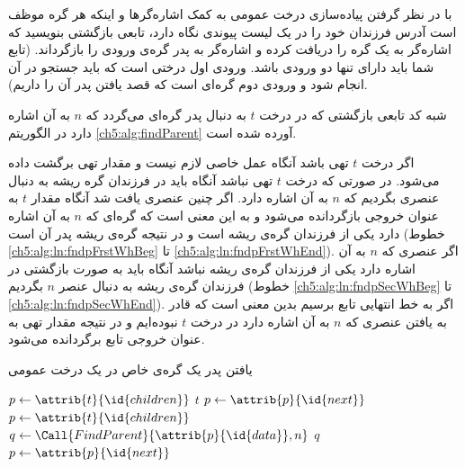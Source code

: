  با در نظر گرفتن پیاده‌سازی درخت عمومی به کمک اشاره‌گرها و اینکه هر گره موظف است آدرس فرزندان خود را در یک لیست پیوندی نگاه دارد، تابعی بازگشتی بنویسید که اشاره‌گر به یک گره را دریافت کرده و اشاره‌گر به پدر گره‌ی ورودی را بازگرداند. (تابع شما باید دارای تنها دو ورودی باشد. ورودی اول درختی است که باید جستجو در آن انجام شود و ورودی دوم گره‌ای است که قصد یافتن پدر آن را داریم).


شبه کد تابعی بازگشتی که در درخت {$t$} به دنبال پدر گره‌‌‌ای می‌گردد که {$n$} به آن اشاره دارد در الگوریتم {\ref{ch5:alg:findParent}} آورده شده است.

اگر درخت {$t$} تهی باشد آنگاه عمل خاصی لازم نیست و مقدار تهی برگشت داده می‌شود. در صورتی که درخت {$t$} تهی نباشد آنگاه باید در فرزندان گره ریشه به دنبال عنصری بگردیم که {$n$} به آن اشاره دارد. اگر چنین عنصری یافت شد آنگاه مقدار {$t$} به عنوان خروجی بازگردانده می‌شود و به این معنی است که گره‌ای که {$n$} به آن اشاره دارد یکی از فرزندان گره‌ی ریشه است و در نتیجه گره‌ی ریشه پدر آن است (خطوط {\ref{ch5:alg:ln:fndpFrstWhBeg}} تا {\ref{ch5:alg:ln:fndpFrstWhEnd}}). اگر عنصری که {$n$} به آن اشاره دارد یکی از فرزندان گره‌ی ریشه نباشد آنگاه باید به صورت بازگشتی در فرزندان گره‌ی ریشه به دنبال عنصر {$n$} بگردیم (خطوط {\ref{ch5:alg:ln:fndpSecWhBeg}} تا {\ref{ch5:alg:ln:fndpSecWhEnd}}). اگر به خط انتهایی تابع برسیم بدین معنی است که قادر به یافتن عنصری که {$n$} به آن اشاره دارد در درخت {$t$} نبوده‌ایم و در نتیجه مقدار تهی به عنوان خروجی تابع برگردانده می‌شود.

\begin{algorithm}
\caption{یافتن پدر یک گره‌ی خاص در یک درخت عمومی}\label{ch5:alg:findParent}
\begin{latin}
\begin{algorithmic}[1]
				\State	\Return {}
		\EndIf
		\State	$p \gets \attrib{t}{\id{children}}$\label{ch5:alg:ln:fndpFrstWhBeg}
						\State	\Return $t$
				\EndIf
				\State	$p \gets \attrib{p}{\id{next}}$
		\EndWhile\label{ch5:alg:ln:fndpFrstWhEnd}
		\State	$p \gets \attrib{t}{\id{children}}$\label{ch5:alg:ln:fndpSecWhBeg}		
				\State	$q \gets \Call{FindParent}{\attrib{p}{\id{data}},n}$
						\State	\Return $q$
				\EndIf
				\State	$p \gets \attrib{p}{\id{next}}$
		\EndWhile\label{ch5:alg:ln:fndpSecWhEnd}
		\State	\Return {}
\EndFunction
\end{algorithmic}
\end{latin}
\end{algorithm}

